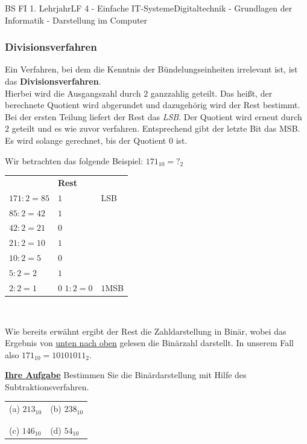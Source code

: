 \documentclass[11pt,twocolumn,oneside,openany,headings=optiontotoc,11pt,numbers=noenddot]{article}
\begin{document}
\begin{worksheet}{BS FI 1. Lehrjahr}{LF 4 - Einfache IT-Systeme}{Digitaltechnik - Grundlagen der Informatik - Darstellung im Computer}
	 	\subsubsection{Divisionsverfahren}
	 	Ein Verfahren, bei dem die Kenntnis der Bündelungseinheiten irrelevant ist, ist das \textbf{Divisionsverfahren}.\\
	 	Hierbei wird die Ausgangszahl durch \(2\) ganzzahlig geteilt. Das heißt, der berechnete Quotient wird abgerundet und dazugehörig wird der Rest bestimmt. Bei der ersten Teilung liefert der Rest das \textit{LSB}. Der Quotient wird erneut durch \(2\) geteilt und es wie zuvor verfahren. Entsprechend gibt der letzte Bit das MSB.\\
	 	Es wird solange gerechnet, bis der Quotient \(0\) ist.\\
	 	\par\noindent
	 	Wir betrachten das folgende Beispiel: \(171_{10} = ?_{2}\)\\
	 	\begin{tabularx}{0.45\textwidth}{XMl}
	 		& \textbf{Rest} & \\
	 		\(171 : 2 = 85\) & \(1\) & LSB\\
	 		\(85 : 2 = 42\) & \(1\)\\
	 		\(42 : 2 = 21\) & \(0\)\\
	 		\(21 : 2 = 10\) & \(1\)\\
	 		\(10 : 2 = 5\) & \(0\)\\
	 		\(5 : 2 = 2\) & \(1\)\\
	 		\(2 : 2 = 1\) & \(0\)
	 		\(1 : 2 = 0\) & \(1\)MSB\\
	 	\end{tabularx}\\
	 	\par\noindent
 		Wie bereits erwähnt ergibt der Rest die Zahldarstellung in Binär, wobei das Ergebnis von \underline{unten nach oben} gelesen die Binärzahl darstellt. In unserem Fall also \colorbox{green!10}{\(171_{10} = 10101011_{2}\)}.\\
 		\par\noindent
 		\textbf{\underline{Ihre Aufgabe}} Bestimmen Sie die Binärdarstellung mit Hilfe des Subtraktionsverfahren.\\
 		\par\bigskip\noindent
 		\begin{tabularx}{0.45\textwidth}{M|M}
 			(a) \(213_{10}\) & (b) \(238_{10}\)\\
 			& \\
 			\hline
 			& \\
 			(c) \(146_{10}\) & (d) \(54_{10}\)\\
 		\end{tabularx}
	\end{worksheet}
\end{document}
